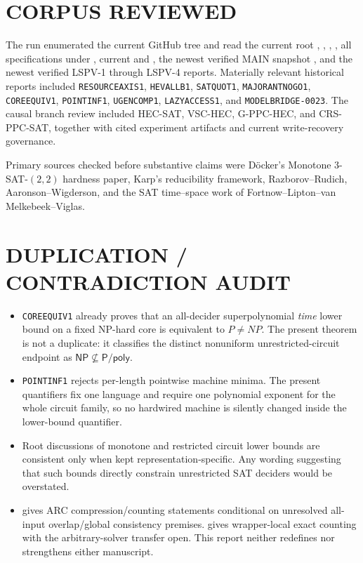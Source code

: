 \documentclass[11pt]{article}
\newcommand{\NP}{\mathsf{NP}}
\begin{document}
\section*{CORPUS REVIEWED}

The run enumerated the current GitHub tree and read the current root , , , , all specifications under , current  and , the newest verified MAIN snapshot , and the newest verified LSPV-1 through LSPV-4 reports.  Materially relevant historical reports included \texttt{RESOURCEAXIS1}, \texttt{HEVALLB1}, \texttt{SATQUOT1}, \texttt{MAJORANTNOGO1}, \texttt{COREEQUIV1}, \texttt{POINTINF1}, \texttt{UGENCOMP1}, \texttt{LAZYACCESS1}, and \texttt{MODELBRIDGE-0023}.  The causal branch review included HEC-SAT, VSC-HEC, G-PPC-HEC, and CRS-PPC-SAT, together with cited experiment artifacts and current write-recovery governance.

Primary sources checked before substantive claims were D\"ocker's Monotone \(3\)-SAT-\((2,2)\) hardness paper, Karp's reducibility framework, Razborov--Rudich, Aaronson--Wigderson, and the SAT time--space work of Fortnow--Lipton--van Melkebeek--Viglas.

\section*{DUPLICATION / CONTRADICTION AUDIT}

\begin{itemize}
  \item \texttt{COREEQUIV1} already proves that an all-decider superpolynomial \emph{time} lower bound on a fixed NP-hard core is equivalent to \(P\ne NP\).  The present theorem is not a duplicate: it classifies the distinct nonuniform unrestricted-circuit endpoint as \(\NP\not\subseteq\mathsf{P/poly}\).
  \item \texttt{POINTINF1} rejects per-length pointwise machine minima.  The present quantifiers fix one language and require one polynomial exponent for the whole circuit family, so no hardwired machine is silently changed inside the lower-bound quantifier.
  \item Root discussions of monotone and restricted circuit lower bounds are consistent only when kept representation-specific.  Any wording suggesting that such bounds directly constrain unrestricted SAT deciders would be overstated.
  \item {} gives ARC compression/counting statements conditional on unresolved all-input overlap/global consistency premises.   gives wrapper-local exact counting with the arbitrary-solver transfer open.  This report neither redefines nor strengthens either manuscript.
\end{itemize}
\end{document}
